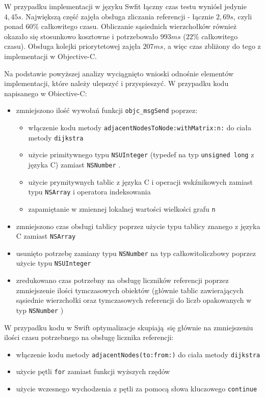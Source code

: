 \documentclass[mgr, shortabstract]{iithesis}
\newcommand{\swiftinline}[1]{
    \texttt{#1}
}
\newcommand{\objcinline}[1]{
    \texttt{#1}
}
\begin{document}
W przypadku implementacji w języku Swfit łączny czas testu wyniósł jedynie $4,45s$. Największą część zajęła obsługa zliczania referencji - łącznie $2,69s$, czyli ponad $60\%$ całkowitego czasu. Obliczanie sąsiednich wierzchołków również okazało się stosunkowo kosztowne i potrzebowało $993ms$ ($22\%$ całkowitego czasu). Obsługa kolejki priorytetowej zajęła $207ms$, a więc czas zbliżony do tego z implementacji w Objective-C.

Na podstawie powyższej analizy wyciągnięto wnioski odnośnie elementów implementacji, które należy ulepszyć i przyspieszyć. W przypadku kodu napisanego w Obiective-C:

\begin{itemize}
    \item zmniejszono ilość wywołań funkcji \objcinline{objc_msgSend} poprzez:
    \begin{itemize}
        \item włączenie kodu metody \objcinline{adjacentNodesToNode:withMatrix:n:} do ciała metody \objcinline{dijkstra}
        \item użycie primitywnego typu \objcinline{NSUInteger} (typedef na typ \objcinline{unsigned long} z języka C) zamiast \objcinline{NSNumber}.
        \item użycie prymitywnych tablic z języka C i operacji wskźnikowych zamiast typu \objcinline{NSArray} i operatora indeksowania
        \item zapamiętanie w zmiennej lokalnej wartości wielkości grafu \objcinline{n}
    \end{itemize}
    \item zmniejszono czas obsługi tablicy poprzez użycie typu tablicy znanego z języka C zamiast \objcinline{NSArray}
    \item usunięto potrzebę zamiany typu \objcinline{NSNumber} na typ całkowitoliczbowy poprzez użycie typu \objcinline{NSUInteger}
    \item zredukowano czas potrzebny na obsługę liczników referencji poprzez zmniejszenie ilości tymczasowych obiektów (głównie tablic zawierających sąsiednie wierzchołki oraz tymczasowych referencji do liczb opakowanych w typ \objcinline{NSNumber})
\end{itemize}

W przypadku kodu w Swift optymalizacje skupiają się głównie na zmniejszeniu ilości czasu potrzebnego na obsługę licznika referencji:

\begin{itemize}
    \item włączenie kodu metody \swiftinline{adjacentNodes(to:from:)} do ciała metody \swiftinline{dijkstra}
    \item użycie pętli \swiftinline{for} zamiast funkcji wyższych rzędów
    \item użycie wczesnego wychodzenia z pętli za pomocą słowa kluczowego \swiftinline{continue}
\end{itemize}
\end{document}
